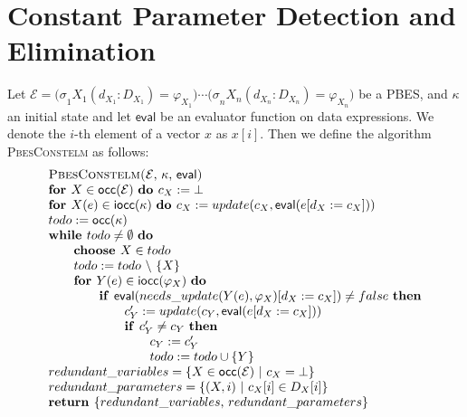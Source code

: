 \documentclass{article}
\begin{document}
\newpage

\section{Constant Parameter Detection and Elimination}

Let $\mathcal{E=(\sigma }_{1}X_{1}(d_{X_{1}}:D_{X_{1}})=\varphi
_{X_{1}})\cdots \mathcal{(\sigma }_{n}X_{n}(d_{X_{n}}:D_{X_{n}})=\varphi
_{X_{n}})$ be a PBES, and $\kappa $ an initial state and let $\mathsf{eval}$
be an evaluator function on data expressions. We denote the $i$-th element
of a vector $x$ as $x[i]$. Then we define the algorithm \textsc{PbesConstelm}
as follows:$\qquad \qquad $%
\begin{equation*}
\begin{array}{l}
\text{\textsc{PbesConstelm(}}\mathcal{E}\text{, }\kappa \text{, }\mathsf{eval%
}\text{\textsc{)}} \\ 
\text{\textbf{for }}X\in \mathsf{occ}(\mathcal{E)}\text{ \textbf{do }}%
c_{X}:=\bot  \\ 
\text{\textbf{for }}X(e)\in \mathsf{iocc}(\kappa \mathcal{)}\text{ \textbf{%
do }}c_{X}:=update(c_{X},\mathsf{eval}(e[d_{X}:=c_{X}])) \\ 
todo:=\mathsf{occ}(\kappa \mathcal{)} \\ 
\text{\textbf{while }}todo\neq \emptyset \text{ \textbf{do}} \\ 
\qquad \text{\textbf{choose }}X\in todo \\ 
\qquad todo:=todo\ \backslash \ \{X\} \\ 
\qquad \text{\textbf{for }}Y(e)\in \mathsf{iocc}(\varphi _{X}\mathcal{)}%
\text{ \textbf{do}} \\ 
\qquad \qquad \text{\textbf{if }}\mathsf{eval}(needs\_update(Y(e),\varphi
_{X})[d_{X}:=c_{X}])\neq false\text{ \textbf{then}} \\ 
\qquad \qquad \qquad c_{Y}^{\prime }:=update(c_{Y},\mathsf{eval}%
(e[d_{X}:=c_{X}])) \\ 
\qquad \qquad \qquad \text{\textbf{if }}c_{Y}^{\prime }\neq c_{Y}\text{ 
\textbf{then}} \\ 
\qquad \qquad \qquad \qquad c_{Y}:=c_{Y}^{\prime } \\ 
\qquad \qquad \qquad \qquad todo:=todo\cup \{Y\} \\ 
redundant\_variables=\{X\in \mathsf{occ}(\mathcal{E)}\ |\ c_{X}=\bot \} \\ 
redundant\_parameters=\{(X,i)\ |\ c_{X}[i]\in D_{X}[i]\} \\ 
\text{\textbf{return }}\{redundant\_variables\text{, }redundant\_parameters\}%
\end{array}%
\end{equation*}
\end{document}
